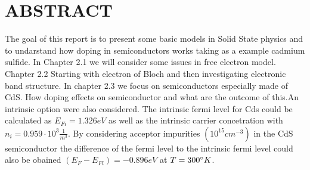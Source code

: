 \section*{ABSTRACT}
The goal of this report is to present some basic models in Solid State physics and to undarstand how doping in semiconductors works taking as a example cadmium sulfide. In Chapter 2.1 we will consider some issues in free electron model. Chapter 2.2 Starting with electron of Bloch and then investigating electronic band structure. In chapter 2.3 we focus on semiconductors especially made of CdS. How doping effects on semiconductor and what are the outcome of this.An intrinsic option were also considered. The intrinsic fermi level for Cds could be calculated
as $E_{Fi} = 1.326 eV$ as well as the intrinsic carrier concetration with
$n_i = 0.959 \cdot 10^3 \frac{1}{m^3}$. By considering acceptor impurities
$(10^{15}cm^{-3})$ in the 
CdS semiconductor the difference of the fermi level to the intrinsic fermi level 
could also be obained $(E_F-E_{Fi}) = -0.896 eV $ at $T=300\degree K$.
